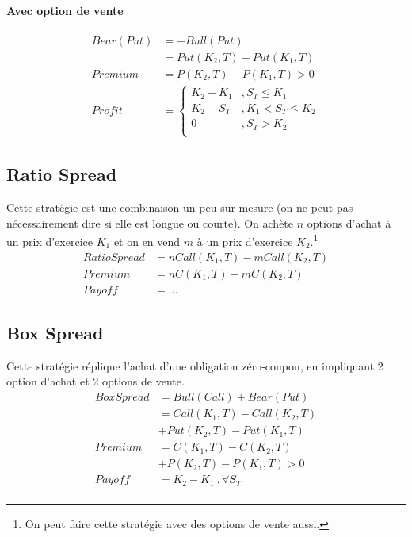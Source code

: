 \documentclass[10pt, french]{article}
\begin{document}
\begin{multicols*}{2}
\paragraph{Avec option de vente}
\begin{align*}
Bear(Put) 				& =  - Bull(Put) \\
								& = Put(K_2, T) - Put(K_1, T) \\
Premium					& = 	 P(K_2,T) - P(K_1,T) > 0 \\
Profit						& = 
\begin{cases}
K_2 - K_1					& , S_T \leq K_1 \\
K_2 - S_T 				& , K_1 < S_T \leq K_2 \\
0								& , S_T > K_2 \\
\end{cases}
\end{align*}


\subsection*{Ratio Spread}
Cette stratégie est une combinaison un peu sur mesure (on ne peut pas nécessairement dire si elle est longue ou courte). On achète $n$ options d'achat à un prix d'exercice $K_1$ et on en vend $m$ à un prix d'exercice $K_2$.\footnote{On peut faire cette stratégie avec des options de vente aussi.}
\begin{align*}
Ratio Spread 		& 	= n Call(K_1, T) - m Call(K_2, T) \\
Premium				& = n C(K_1, T) - m C(K_2,T) \\
Payoff					& = ...
\end{align*}

\subsection*{Box Spread}
Cette stratégie réplique l'achat d'une obligation zéro-coupon, en impliquant 2 option d'achat et 2 options de vente.
\begin{align*}
Box Spread			& = Bull(Call) + Bear(Put) \\
& = Call(K_1, T) - Call(K_2, T)  \\
& + Put(K_2, T) - Put(K_1, T) \\
Premium				& = C(K_1, T) - C(K_2, T) \\
							&  + P(K_2, T) - P(K_1,T) >  0 \\
Payoff					& = K_2 - K_1  \ , \forall S_T \\
\end{align*}




\end{multicols*}
\end{document}
